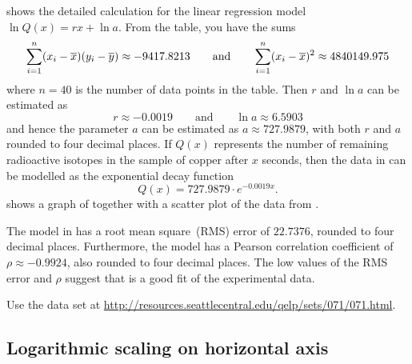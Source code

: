 \documentclass[a4paper,oneside,12pt]{article}
\begin{document}
{\begin{solution}
 shows the detailed
calculation for the linear regression model
$\ln Q(x) = rx + \ln a$.  From the table, you have the sums
\[
\sum_{i=1}^n (x_i - \overline{x}) (y_i - \overline{y})
\approx
-9417.8213
\qquad
\text{and}
\qquad
\sum_{i=1}^n (x_i - \overline{x})^2
\approx
4840149.975
\]
where $n = 40$ is the number of data points in the table.  Then $r$
and $\ln a$ can be estimated as
\[
r
\approx
-0.0019
\qquad
\text{and}
\qquad
\ln a
\approx
6.5903
\]
and hence the parameter $a$ can be estimated as
$a \approx 727.9879$, with both $r$ and $a$ rounded to four decimal
places.  If $Q(x)$ represents the number of remaining radioactive
isotopes in the sample of copper after $x$ seconds, then the data in
 can be modelled as the
exponential decay function
\begin{equation}
\label{eqn:logarithm:copper_decay_model}
Q(x)
=
727.9879 \cdot e^{-0.0019 x}.
\end{equation}
 shows a
graph of  together with a
scatter plot of the data from
.

The model in  has a root
mean square~(RMS) error of $22.7376$, rounded to four decimal places.
Furthermore, the model has a Pearson correlation coefficient of
$\rho \approx -0.9924$, also rounded to four decimal places.  The low
values of the RMS error and $\rho$ suggest that
 is a good fit of the
experimental data.
\end{solution}
}{}

\begin{exercise}
Use the data set at
\url{http://resources.seattlecentral.edu/qelp/sets/071/071.html}.
\end{exercise}




\subsection{Logarithmic scaling on horizontal axis}
\label{subsec:logarithm:logarithmic_scaling_on_horizontal_axis}
\end{document}

